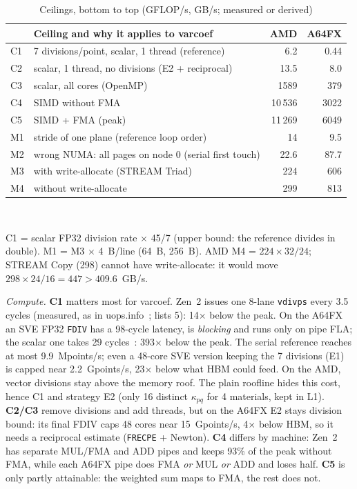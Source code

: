 \documentclass[conference,10pt]{IEEEtran}
\begin{document}
\begin{table}[!t]\centering\scriptsize
\caption{Ceilings, bottom to top (GFLOP/s, GB/s; measured or derived)}\label{tab:ceil}
\begin{tabular}{@{}llrr@{}}\toprule
 & \textbf{Ceiling and why it applies to varcoef} & \textbf{AMD} & \textbf{A64FX} \\ \midrule
C1 & 7 divisions/point, scalar, 1 thread (reference) & 6.2 & 0.44 \\
C2 & scalar, 1 thread, no divisions (E2 + reciprocal) & 13.5 & 8.0 \\
C3 & scalar, all cores (OpenMP) & 1589 & 379 \\
C4 & SIMD without FMA & 10\,536 & 3022 \\
C5 & SIMD + FMA (peak) & 11\,269 & 6049 \\ \midrule
M1 & stride of one plane (reference loop order) & 14 & 9.5 \\
M2 & wrong NUMA: all pages on node 0 (serial first touch) & 22.6 & 87.7 \\
M3 & with write-allocate (STREAM Triad) & 224 & 606 \\
M4 & without write-allocate & 299 & 813 \\ \bottomrule
\end{tabular}\\[1pt]
\raggedright\scriptsize C1 = scalar FP32 division rate $\times$ 45/7 (upper bound: the reference divides in
double). M1 = M3 $\times$ 4~B/line (64~B, 256~B). AMD M4 = $224\times32/24$; STREAM Copy (298) cannot
have write-allocate: it would move $298\times24/16=447>409.6$~GB/s.
\end{table}

\emph{Compute.} \textbf{C1} matters most for varcoef. Zen~2 issues one 8-lane \texttt{vdivps} every
3.5 cycles (measured, as in uops.info~\cite{uopsinfo}; \cite{amd56305} lists 5): 14$\times$ below the peak.
On the A64FX an SVE FP32 \texttt{FDIV} has a 98-cycle latency, is \emph{blocking} and runs only on
pipe FLA; the scalar one takes 29 cycles~\cite[Tables 16-2, 16-3]{a64fx}: 393$\times$ below the
peak. The serial reference reaches at most 9.9~Mpoints/s; even a 48-core SVE version keeping the 7
divisions (E1) is capped near 2.2~Gpoints/s, 23$\times$ below what HBM could feed. On the AMD,
vector divisions stay above the memory roof. The plain roofline hides this cost, hence C1
and strategy E2 (only 16 distinct $\kappa_{pq}$ for 4 materials, kept in L1). \textbf{C2/C3} remove divisions and add threads, but on the A64FX E2 stays division bound: its
final FDIV caps 48 cores near 15~Gpoints/s, 4$\times$ below HBM, so it needs a reciprocal estimate
(\texttt{FRECPE} + Newton).
\textbf{C4} differs by machine: Zen~2 has separate MUL/FMA and ADD pipes and keeps 93\% of the peak
without FMA, while each A64FX pipe does FMA \emph{or} MUL \emph{or} ADD and loses half.
\textbf{C5} is only partly attainable: the weighted sum maps to FMA, the rest does not.
\end{document}
